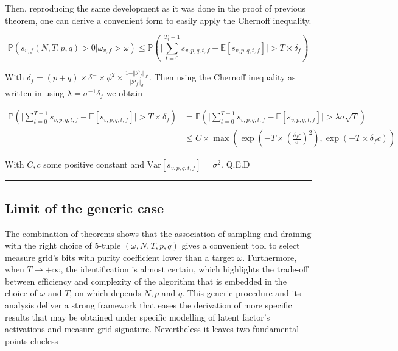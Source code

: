 \documentclass[a4paper, 11pt]{article}
\newcommand{\Var}{\mathrm{Var}}
\begin{document}
Then, reproducing the same development as it was done in the proof of previous theorem, one can derive a convenient form to easily apply the Chernoff inequality.

\begin{equation*}
\mathbb{P} \left( s_{v, f}(N, T, p, q) > 0 \vert \omega_{v, f} > \omega \right) \leq \mathbb{P}\left(\vert \sum_{t=0}^{T_i - 1} s_{v, p, q, t, f} - \mathbb{E}\left[s_{v, p, q, t, f}\right] \vert > T \times \delta_{f} \right)
\end{equation*}

With $\delta_{f} = (p + q) \times \delta^{-} \times \phi^{2} \times \frac{1 - \Vert \mathcal{P}_{f} \Vert_{d'}}{\Vert \mathcal{P}_{f} \Vert_{d'}}$. Then using the Chernoff inequality as written in \cite{TAO-1} using $\lambda = \sigma^{-1} \delta_{f}$ we obtain


\begin{align*}
\mathbb{P}\left(\vert \sum_{t=0}^{T - 1} s_{v, p, q, t, f} - \mathbb{E}\left[s_{v, p, q, t, f}\right] \vert > T \times \delta_{f} \right) &= \mathbb{P}\left(\vert \sum_{t=0}^{T - 1} s_{v, p, q, t, f} - \mathbb{E}\left[s_{v, p, q, t, f}\right] \vert > \lambda \sigma \sqrt{T} \right) \\
&\leq C \times \max \left( \exp\left(- T \times \left(\frac{\delta_{f} c}{\sigma}\right)^2 \right), \exp\left(- T \times \delta_{f}c \right) \right)
\end{align*}

With $C, c$ some positive constant and $\Var[s_{v, p, q, t, f}] = \sigma^2$. Q.E.D

\begin{center}
\rule[0pt]{100pt}{1pt} 
\end{center}

\subsection{Limit of the generic case}

The combination of theorems shows that the association of sampling and draining with the right choice of 5-tuple $(\omega, N, T, p, q)$ gives a convenient tool to select measure grid's bits with purity coefficient lower than a target $\omega$. Furthermore, when $T \rightarrow +\infty$, the identification is almost certain, which highlights the trade-off between efficiency and complexity of the algorithm that is embedded in the choice of $\omega$ and $T$, on which depends $N, p$ and $q$.
This generic procedure and its analysis deliver a strong framework that eases the derivation of more specific results that may be obtained under specific modelling of latent factor's activations and measure grid signature. Nevertheless it leaves two fundamental points clueless 
\end{document}
